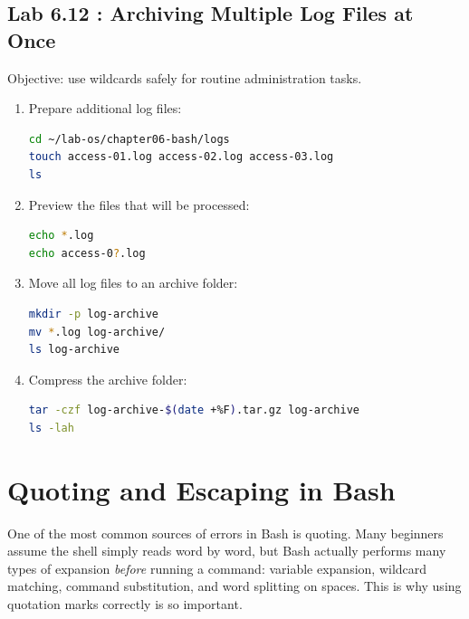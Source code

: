 \subsection*{Lab 6.12 : Archiving Multiple Log Files at Once}

Objective: use wildcards safely for routine administration tasks.

\begin{enumerate}
  \item Prepare additional log files:
\begin{lstlisting}[language=bash, caption={Preparing additional log files}]
cd ~/lab-os/chapter06-bash/logs
touch access-01.log access-02.log access-03.log
ls
\end{lstlisting}

  \item Preview the files that will be processed:
\begin{lstlisting}[language=bash, caption={Previewing the wildcard result}]
echo *.log
echo access-0?.log
\end{lstlisting}

  \item Move all log files to an archive folder:
\begin{lstlisting}[language=bash, caption={Moving log files to the archive folder}]
mkdir -p log-archive
mv *.log log-archive/
ls log-archive
\end{lstlisting}

  \item Compress the archive folder:
\begin{lstlisting}[language=bash, caption={Creating a compressed archive}]
tar -czf log-archive-$(date +%F).tar.gz log-archive
ls -lah
\end{lstlisting}
\end{enumerate}

\section{Quoting and Escaping in Bash}
\label{sec:quoting-escaping}

One of the most common sources of errors in Bash is quoting. Many beginners
assume the shell simply reads word by word, but Bash actually performs many
types of expansion \textit{before} running a command: variable expansion,
wildcard matching, command substitution, and word splitting on spaces. This
is why using quotation marks correctly is so important.

